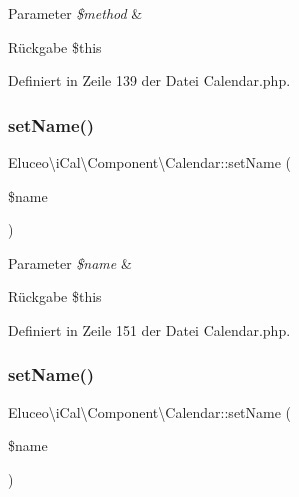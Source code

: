 \begin{DoxyParams}{Parameter}
{\em \$method} & \\
\hline
\end{DoxyParams}
\begin{DoxyReturn}{Rückgabe}
\$this 
\end{DoxyReturn}


Definiert in Zeile 139 der Datei Calendar.\+php.

\mbox{\label{class_eluceo_1_1i_cal_1_1_component_1_1_calendar_adf80b9aa9dc6481fe45b78142ae1aec2}} 
\subsubsection{\texorpdfstring{set\+Name()}{setName()}\hspace{0.1cm}{\footnotesize\ttfamily [1/3]}}
{\footnotesize\ttfamily Eluceo\textbackslash{}i\+Cal\textbackslash{}\+Component\textbackslash{}\+Calendar\+::set\+Name (\begin{DoxyParamCaption}\item[{}]{\$name }\end{DoxyParamCaption})}


\begin{DoxyParams}{Parameter}
{\em \$name} & \\
\hline
\end{DoxyParams}
\begin{DoxyReturn}{Rückgabe}
\$this 
\end{DoxyReturn}


Definiert in Zeile 151 der Datei Calendar.\+php.

\mbox{\label{class_eluceo_1_1i_cal_1_1_component_1_1_calendar_adf80b9aa9dc6481fe45b78142ae1aec2}} 
\subsubsection{\texorpdfstring{set\+Name()}{setName()}\hspace{0.1cm}{\footnotesize\ttfamily [2/3]}}
{\footnotesize\ttfamily Eluceo\textbackslash{}i\+Cal\textbackslash{}\+Component\textbackslash{}\+Calendar\+::set\+Name (\begin{DoxyParamCaption}\item[{}]{\$name }\end{DoxyParamCaption})}


